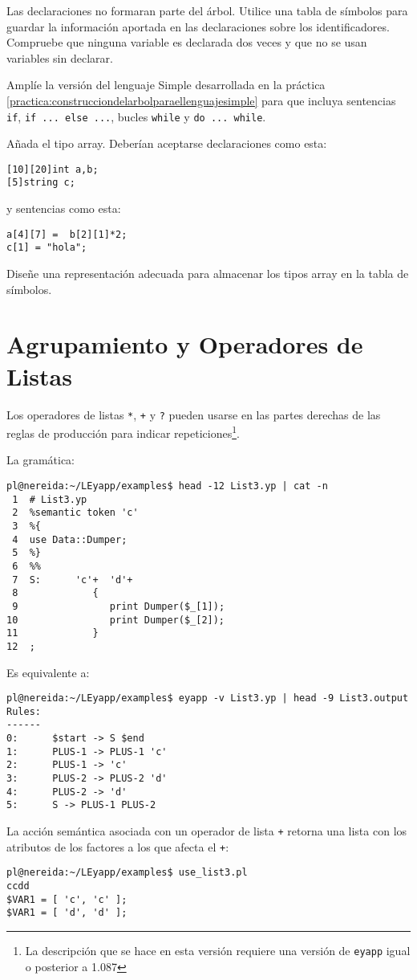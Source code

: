 Las declaraciones no formaran parte del árbol.
Utilice una tabla de símbolos para guardar 
la información aportada en las declaraciones
sobre los identificadores. Compruebe que ninguna variable 
es declarada dos veces y que no se usan variables sin declarar.

\label{practica:apliaciondellenguajesimple}

Amplíe  la versión del lenguaje Simple desarrollada en la práctica
\ref{practica:construcciondelarbolparaellenguajesimple}
para que incluya sentencias \verb|if|,
\verb|if ... else ...|, bucles \verb|while| y \verb|do ... while|.

Añada el tipo array. Deberían aceptarse declaraciones como esta:

\begin{verbatim}
[10][20]int a,b;
[5]string c;
\end{verbatim}

y sentencias como esta:

\begin{verbatim}
a[4][7] =  b[2][1]*2;
c[1] = "hola";
\end{verbatim}

Diseñe una representación adecuada para almacenar 
los tipos array en la tabla de símbolos. 

\section{Agrupamiento y Operadores de Listas}

Los operadores de listas \verb|*|, \verb|+| y \verb|?| pueden
usarse en las partes derechas de las reglas de producción para indicar
repeticiones\footnote{La descripción que se hace en esta versión 
requiere una versión de {\tt eyapp} igual o posterior a 1.087}. 


La gramática:
\begin{verbatim}
pl@nereida:~/LEyapp/examples$ head -12 List3.yp | cat -n
 1  # List3.yp
 2  %semantic token 'c'
 3  %{
 4  use Data::Dumper;
 5  %}
 6  %%
 7  S:      'c'+  'd'+
 8             {
 9                print Dumper($_[1]);
10                print Dumper($_[2]);
11             }
12  ;
\end{verbatim}
Es equivalente a:
\begin{verbatim}
pl@nereida:~/LEyapp/examples$ eyapp -v List3.yp | head -9 List3.output
Rules:
------
0:      $start -> S $end
1:      PLUS-1 -> PLUS-1 'c'
2:      PLUS-1 -> 'c'
3:      PLUS-2 -> PLUS-2 'd'
4:      PLUS-2 -> 'd'
5:      S -> PLUS-1 PLUS-2
\end{verbatim}
La acción semántica asociada con un operador de lista \verb|+| retorna una
lista con los atributos de los factores a los que afecta el \verb|+|:
\begin{verbatim}
pl@nereida:~/LEyapp/examples$ use_list3.pl
ccdd
$VAR1 = [ 'c', 'c' ];
$VAR1 = [ 'd', 'd' ];
\end{verbatim}

